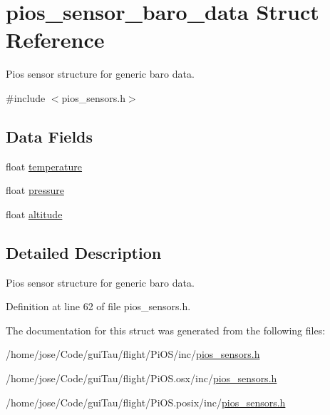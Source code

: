 \hypertarget{structpios__sensor__baro__data}{\section{pios\-\_\-sensor\-\_\-baro\-\_\-data Struct Reference}
\label{structpios__sensor__baro__data}
}


Pios sensor structure for generic baro data.  




{\ttfamily \#include $<$pios\-\_\-sensors.\-h$>$}

\subsection*{Data Fields}
\begin{DoxyCompactItemize}
\item 
float \hyperlink{group___p_i_o_s___s_e_n_s_o_r_s_ga9cb0c320301d3a8028859d3bf920669f}{temperature}
\item 
float \hyperlink{group___p_i_o_s___s_e_n_s_o_r_s_ga43ba219138a0c31669a1af1b45f7a7f6}{pressure}
\item 
float \hyperlink{group___p_i_o_s___s_e_n_s_o_r_s_ga36e1ee62fc132c0b2c992ef8efc5bb81}{altitude}
\end{DoxyCompactItemize}


\subsection{Detailed Description}
Pios sensor structure for generic baro data. 

Definition at line 62 of file pios\-\_\-sensors.\-h.



The documentation for this struct was generated from the following files\-:\begin{DoxyCompactItemize}
\item 
/home/jose/\-Code/gui\-Tau/flight/\-Pi\-O\-S/inc/\hyperlink{inc_2pios__sensors_8h}{pios\-\_\-sensors.\-h}\item 
/home/jose/\-Code/gui\-Tau/flight/\-Pi\-O\-S.\-osx/inc/\hyperlink{osx_2inc_2pios__sensors_8h}{pios\-\_\-sensors.\-h}\item 
/home/jose/\-Code/gui\-Tau/flight/\-Pi\-O\-S.\-posix/inc/\hyperlink{posix_2inc_2pios__sensors_8h}{pios\-\_\-sensors.\-h}\end{DoxyCompactItemize}
